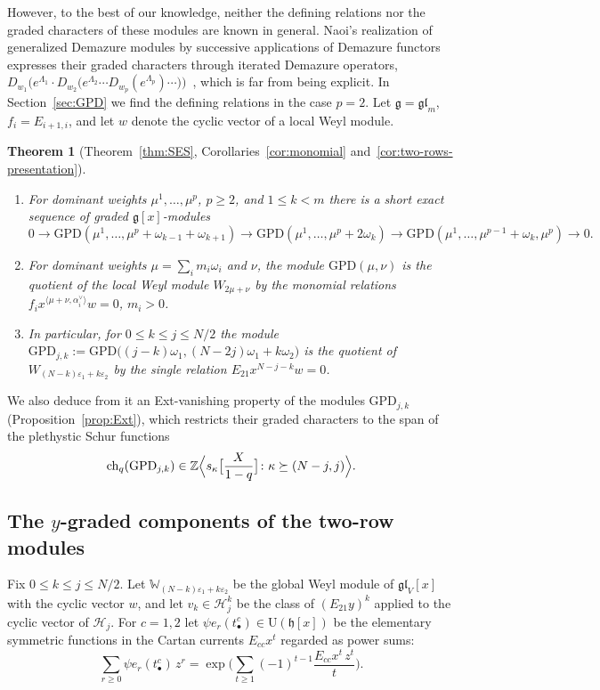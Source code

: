 \documentclass[11pt]{amsart}
\numberwithin{equation}{section}
\newtheorem{introthm}{Theorem}
\theoremstyle{definition}
\newcommand{\gl}{\mathfrak{gl}}
\newcommand{\fg}{\mathfrak{g}}
\newcommand{\fh}{\mathfrak{h}}
\newcommand{\U}{\mathrm{U}}
\newcommand{\bW}{\mathbb{W}}          %
\newcommand{\GPD}{\mathrm{GPD}}         %
\newcommand{\eps}{\varepsilon}
\newcommand{\ch}{\mathrm{ch}}
\begin{document}
	However, to the best of our knowledge, neither the defining relations nor the graded characters of these modules are known in general. Naoi's realization of generalized Demazure modules by successive applications of Demazure functors~\cite[\S2]{Naoi} expresses their graded characters through iterated Demazure operators, $D_{w_1}\big(e^{\Lambda_1}\cdot D_{w_2}\big(e^{\Lambda_2}\cdots D_{w_p}(e^{\Lambda_p})\cdots\big)\big)$~\cite{LLM}, which is far from being explicit. In Section~\ref{sec:GPD} we find the defining relations in the case $p=2$. Let $\fg=\gl_m$, $f_i=E_{i+1,i}$, and let $w$ denote the cyclic vector of a local Weyl module.
	
	\begin{introthm}[Theorem~\ref{thm:SES}, Corollaries~\ref{cor:monomial} and~\ref{cor:two-rows-presentation}]\label{thm:introA}
		\begin{enumerate}
			\item For dominant weights $\mu^1,\dots,\mu^p$, $p\ge2$, and $1\le k<m$ there is a short exact sequence of graded $\fg[x]$-modules
			\[
			0\to\GPD(\mu^1,\dots,\mu^p+\omega_{k-1}+\omega_{k+1})\to\GPD(\mu^1,\dots,\mu^p+2\omega_k)\to\GPD(\mu^1,\dots,\mu^{p-1}+\omega_k,\mu^p)\to0 .
			\]
			\item For dominant weights $\mu=\sum_im_i\omega_i$ and $\nu$, the module $\GPD(\mu,\nu)$ is the quotient of the local Weyl module $W_{2\mu+\nu}$ by the monomial relations $f_ix^{\langle\mu+\nu,\alpha_i^\vee\rangle}w=0$, $m_i>0$.
			\item In particular, for $0\le k\le j\le N/2$ the module $\GPD_{j,k}:=\GPD\big((j-k)\omega_1,(N-2j)\omega_1+k\omega_2\big)$ is the quotient of $W_{(N-k)\eps_1+k\eps_2}$ by the single relation $E_{21}x^{N-j-k}w=0$.
		\end{enumerate}
	\end{introthm}
	
	We also deduce from it an Ext-vanishing property of the modules $\GPD_{j,k}$ (Proposition~\ref{prop:Ext}), which restricts their graded characters to the span of the plethystic Schur functions 
	$$\ch_q(\GPD_{j,k})\in \mathbb{Z}\Bigl\langle s_\kappa\big[\frac X{1-q}\big] \colon \kappa\succeq(N-j,j)\Bigr\rangle.$$
	
	\subsection{The \texorpdfstring{$y$}{y}-graded components of the two-row modules}
	
	Fix $0\le k\le j\le N/2$. Let $\bW_{(N-k)\eps_1+k\eps_2}$ be the global Weyl module of $\gl_V[x]$ with the cyclic vector $w$, and let $v_k\in\mathcal H_j^k$ be the class of $(E_{21}y)^k$ applied to the cyclic vector of $\mathcal H_j$. For $c=1,2$ let $\psi e_r(t^c_\bullet)\in\U(\fh[x])$ be the elementary symmetric functions in the Cartan currents $E_{cc}x^t$ regarded as power sums:
	\[
	\sum_{r\ge0}\psi e_r(t^c_\bullet)\,z^r=\exp\Big(\sum_{t\ge1}(-1)^{t-1}\frac{E_{cc}x^t\,z^t}{t}\Big).
	\]
	
\end{document}
